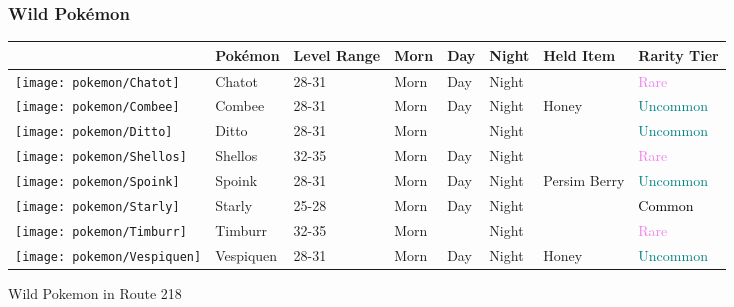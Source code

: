 \subsubsection{Wild Pokémon}%
\label{ssubsec:WildPokmon}%
\begin{longtable}{||l l l l l l l l||}%
\hline%
&Pokémon&Level Range&Morn&Day&Night&Held Item&Rarity Tier\\%
\hline%
\endhead%
\hline%
\texttt{[image: pokemon/Chatot]}&Chatot&28{-}31&Morn&Day&Night&&\textcolor{violet}{%
Rare%
}\\%
\hline%
\texttt{[image: pokemon/Combee]}&Combee&28{-}31&Morn&Day&Night&Honey&\textcolor{teal}{%
Uncommon%
}\\%
\hline%
\texttt{[image: pokemon/Ditto]}&Ditto&28{-}31&Morn&&Night&&\textcolor{teal}{%
Uncommon%
}\\%
\hline%
\texttt{[image: pokemon/Shellos]}&Shellos&32{-}35&Morn&Day&Night&&\textcolor{violet}{%
Rare%
}\\%
\hline%
\texttt{[image: pokemon/Spoink]}&Spoink&28{-}31&Morn&Day&Night&Persim Berry&\textcolor{teal}{%
Uncommon%
}\\%
\hline%
\texttt{[image: pokemon/Starly]}&Starly&25{-}28&Morn&Day&Night&&\textcolor{black}{%
Common%
}\\%
\hline%
\texttt{[image: pokemon/Timburr]}&Timburr&32{-}35&Morn&&Night&&\textcolor{violet}{%
Rare%
}\\%
\hline%
\texttt{[image: pokemon/Vespiquen]}&Vespiquen&28{-}31&Morn&Day&Night&Honey&\textcolor{teal}{%
Uncommon%
}\\%
\hline%
\end{longtable}%
\caption{Wild Pokemon in Route 218}